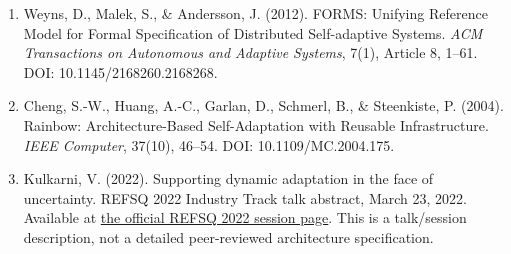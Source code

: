 \documentclass[11pt,a4paper]{article}
\begin{document}
\begin{enumerate}
\item Weyns, D., Malek, S., \& Andersson, J. (2012). FORMS: Unifying Reference Model for Formal Specification of Distributed Self-adaptive Systems. \textit{ACM Transactions on Autonomous and Adaptive Systems}, 7(1), Article 8, 1--61. DOI: 10.1145/2168260.2168268.
\item Cheng, S.-W., Huang, A.-C., Garlan, D., Schmerl, B., \& Steenkiste, P. (2004). Rainbow: Architecture-Based Self-Adaptation with Reusable Infrastructure. \textit{IEEE Computer}, 37(10), 46--54. DOI: 10.1109/MC.2004.175.
\item Kulkarni, V. (2022). Supporting dynamic adaptation in the face of uncertainty. REFSQ 2022 Industry Track talk abstract, March 23, 2022. Available at \href{https://2022.refsq.org/details/refsq-2022-industry-track/2/Supporting-dynamic-adaptation-in-the-face-of-uncertainty}{the official REFSQ 2022 session page}. This is a talk/session description, not a detailed peer-reviewed architecture specification.
\end{enumerate}
\end{document}
